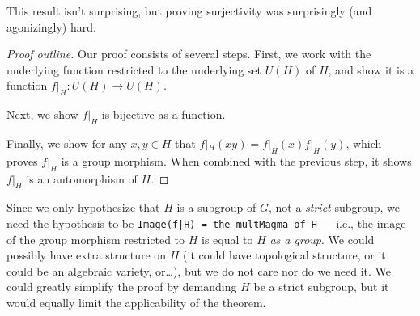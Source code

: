 This result isn't surprising, but proving surjectivity was surprisingly
(and agonizingly) hard.

\begin{proof}[Proof outline]
  Our proof consists of several steps. First, we work with the
  underlying function restricted to the underlying set $U(H)$ of $H$, and show
  it is a function $f|_{H}\colon U(H)\to U(H)$.

  Next, we show $f|_{H}$ is bijective as a function.

  Finally, we show for any $x,y\in H$ that $f|_{H}(xy)=f|_{H}(x)f|_{H}(y)$,
  which proves $f|_{H}$ is a group morphism.
  When combined with the previous step, it shows $f|_{H}$ is an
  automorphism of $H$.
\end{proof}

\begin{thm-remark}
Since we only hypothesize that $H$ is a subgroup of $G$, not a
\emph{strict} subgroup, we need the hypothesis to be
\lstinline{Image(f|H) = the multMagma of H} --- i.e., the image of the
group morphism restricted to $H$ is equal to $H$ \emph{as a group}. We
could possibly have extra structure on $H$ (it could have topological
structure, or it could be an algebraic variety, or\dots), but we do not
care nor do we need it. We could greatly simplify the proof by demanding
$H$ be a strict subgroup, but it would equally limit the applicability
of the theorem.
\end{thm-remark}

